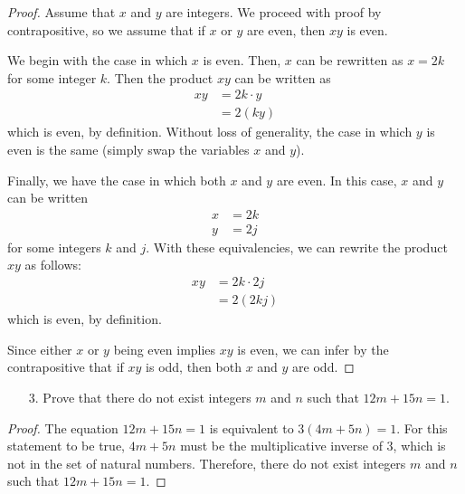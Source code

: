 \documentclass[10pt]{article}
\theoremstyle{definition}
\theoremstyle{plain}
\begin{document}
\setcounter{equation}{0}
\begin{proof}
Assume that $x$ and $y$ are integers. We proceed with proof by contrapositive, so we assume that if $x$ or $y$ are even, then $xy$ is even.

We begin with the case in which $x$ is even. Then, $x$ can be rewritten as $x=2k$ for some integer $k$. Then the product $xy$ can be written as
\begin{align}
    xy &= 2k\cdot y \\
       &= 2(ky)
\end{align}
which is even, by definition. Without loss of generality, the case in which $y$ is even is the same (simply swap the variables $x$ and $y$).

Finally, we have the case in which both $x$ and $y$ are even. In this case, $x$ and $y$ can be written
\begin{align}
    x &= 2k \\
    y &= 2j
\end{align}
for some integers $k$ and $j$. With these equivalencies, we can rewrite the product $xy$ as follows:
\begin{align}
    xy &= 2k\cdot 2j \\
       &= 2(2kj)
\end{align}
which is even, by definition.

Since either $x$ or $y$ being even implies $xy$ is even, we can infer by the contrapositive that if $xy$ is odd, then both $x$ and $y$ are odd.
\end{proof}



\pagebreak



\begin{enumerate}
  \item[3.] Prove that there do not exist integers $m$ and $n$ such that $12m + 15n = 1$.
\end{enumerate}

\setcounter{equation}{0}
\begin{proof}
  The equation $12m + 15n = 1$ is equivalent to $3(4m+5n)=1$. For this statement to be true, $4m+5n$ must be the multiplicative inverse of $3$, which is not in the set of natural numbers. Therefore, there do not exist integers $m$ and $n$ such that $12m + 15n = 1$.
\end{proof}



\pagebreak
\end{document}
